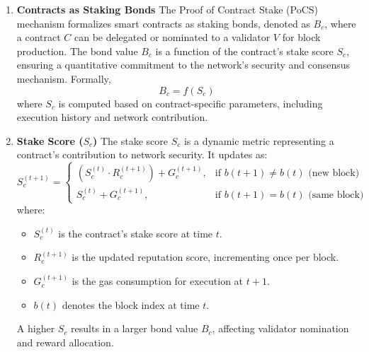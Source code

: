 \documentclass{article}
\begin{document}
\begin{enumerate}
    \item \textbf{Contracts as Staking Bonds} The Proof of Contract Stake (PoCS) mechanism formalizes smart contracts as staking bonds, denoted as $B_c$, where a contract $C$ can be delegated or nominated to a validator $V$ for block production. The bond value $B_c$ is a function of the contract’s stake score $S_c$, ensuring a quantitative commitment to the network’s security and consensus mechanism. Formally, 
    \begin{equation}
        B_c = f(S_c)
    \end{equation}
    where $S_c$ is computed based on contract-specific parameters, including execution history and network contribution.
    
    \item \textbf{Stake Score ($S_c$)} The stake score $S_c$ is a dynamic metric representing a contract’s contribution to network security. It updates as:  
    \begin{equation}
        S_c^{(t+1)} =
        \begin{cases} 
        (S_c^{(t)} \cdot R_c^{(t+1)}) + G_c^{(t+1)}, & \text{if } b(t+1) \neq b(t) \text{ (new block)} \\
        S_c^{(t)} + G_c^{(t+1)}, & \text{if } b(t+1) = b(t) \text{ (same block)}
        \end{cases}
    \end{equation}
    where:
    \begin{itemize}
        \item $S_c^{(t)}$ is the contract’s stake score at time $t$.
        \item $R_c^{(t+1)}$ is the updated reputation score, incrementing once per block.
        \item $G_c^{(t+1)}$ is the gas consumption for execution at $t+1$.
        \item $b(t)$ denotes the block index at time $t$.
    \end{itemize}
    A higher $S_c$ results in a larger bond value $B_c$, affecting validator nomination and reward allocation.


\end{enumerate}
\end{document}
